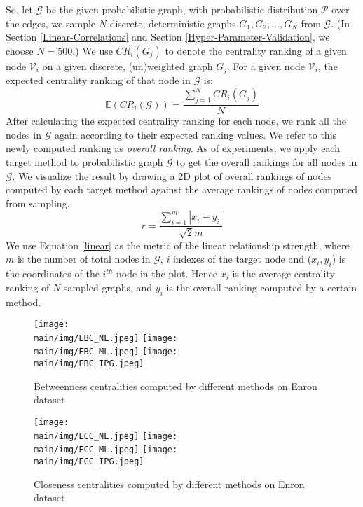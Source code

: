 \documentclass[\main/thesis.tex]{subfiles}
\begin{document}
So, let $\mathcal{G}$ be the given probabilistic graph, with probabilistic distribution $\mathcal{P}$ over the edges, we sample $N$ discrete, deterministic graphs $G_1, G_2, ..., G_N$ from $\mathcal{G}$. (In Section \ref{Linear-Correlations} and Section \ref{Hyper-Parameter-Validation}, we choose $N=500$.) We use $CR_{i}(G_{j})$ to denote the centrality ranking of a given node $\mathcal{V}_i$ on a given discrete, (un)weighted graph $G_{j}$. For a given node $\mathcal{V}_i$, the expected centrality ranking of that node in $\mathcal{G}$ is:
\begin{equation}
\mathbb{E}(CR_{i}(\mathcal{G})) = \frac{\sum_{j=1}^{N}CR_{i}(G_j)}{N}
\end{equation}
After calculating the expected centrality ranking for each node, we rank all the nodes in $\mathcal{G}$ again according to their expected ranking values. We refer to this newly computed ranking as \textit{overall ranking}. As of experiments, we apply each target method to probabilistic graph $\mathcal{G}$ to get the overall rankings for all nodes in $\mathcal{G}$. We visualize the result by drawing a 2D plot of overall rankings of nodes computed by each target method against the average rankings of nodes computed from sampling. 
\begin{equation}
r = \frac{\sum_{i=1}^{m} |x_i - y_i|}{\sqrt{2}m} \label{linear}
\end{equation}
We use Equation \ref{linear} as the metric of the linear relationship strength, where $m$ is the number of total nodes in $\mathcal{G}$, $i$ indexes of the target node and ($x_i, y_i$) is the coordinates of the $i^{th}$ node in the plot. Hence $x_i$ is  the average centrality ranking of $N$ sampled graphs, and $y_i$ is the overall ranking computed by a certain method.

\begin{figure}
\texttt{[image: \\main/img/EBC\_NL.jpeg]}
\texttt{[image: \\main/img/EBC\_ML.jpeg]}
\centering
\texttt{[image: \\main/img/EBC\_IPG.jpeg]}

\caption{Betweenness centralities computed by different methods on Enron dataset}
\label{btw_enron}
\end{figure}

\begin{figure}
\texttt{[image: \\main/img/ECC\_NL.jpeg]}
\texttt{[image: \\main/img/ECC\_ML.jpeg]}
\centering
\texttt{[image: \\main/img/ECC\_IPG.jpeg]}
\caption{Closeness centralities computed by different methods on Enron dataset}
\label{cl_enron}
\end{figure}
\end{document}

